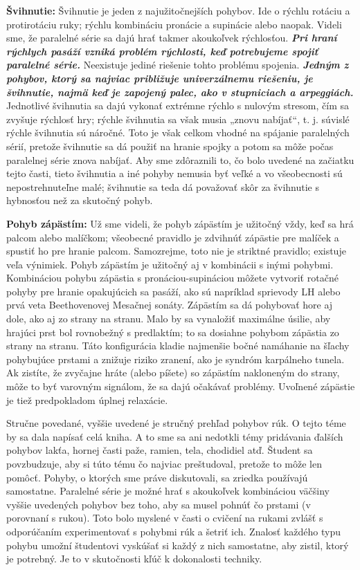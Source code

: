 \documentclass[11pt,a4paper%
]{book}
\begin{document}
\textbf{Švihnutie:} Švihnutie je jeden z najužitočnejších pohybov. Ide o rýchlu rotáciu a protirotáciu ruky; rýchlu kombináciu pronácie a supinácie alebo naopak. Videli sme, že paralelné série sa dajú hrať takmer akoukoľvek rýchlosťou. \emph{\textbf{Pri hraní rýchlych pasáží vzniká problém rýchlosti, keď potrebujeme spojiť paralelné série.}} Neexistuje jediné riešenie tohto problému spojenia. \emph{\textbf{Jedným z pohybov, ktorý sa najviac približuje univerzálnemu riešeniu, je švihnutie, najmä keď je zapojený palec, ako v stupniciach a arpeggiách.}} Jednotlivé švihnutia sa dajú vykonať extrémne rýchlo s nulovým stresom, čím sa zvyšuje rýchlosť hry; rýchle švihnutia sa však musia „znovu nabíjať``, t. j. súvislé rýchle švihnutia sú náročné. Toto je však celkom vhodné na spájanie paralelných sérií, pretože švihnutie sa dá použiť na hranie spojky a potom sa môže počas paralelnej série znova nabíjať. Aby sme zdôraznili to, čo bolo uvedené na začiatku tejto časti, tieto švihnutia a iné pohyby nemusia byť veľké a vo všeobecnosti sú nepostrehnuteľne malé; švihnutie sa teda dá považovať skôr za švihnutie s hybnosťou než za skutočný pohyb.

\textbf{Pohyb zápästím:} Už sme videli, že pohyb zápästím je užitočný vždy, keď sa hrá palcom alebo malíčkom; všeobecné pravidlo je zdvihnúť zápästie pre malíček a spustiť ho pre hranie palcom. Samozrejme, toto nie je striktné pravidlo; existuje veľa výnimiek. Pohyb zápästím je užitočný aj v kombinácii s inými pohybmi. Kombináciou pohybu zápästia s pronáciou-supináciou môžete vytvoriť rotačné pohyby pre hranie opakujúcich sa pasáží, ako sú napríklad sprievody LH alebo prvá veta Beethovenovej Mesačnej sonáty. Zápästím sa dá pohybovať hore aj dole, ako aj zo strany na stranu. Malo by sa vynaložiť maximálne úsilie, aby hrajúci prst bol rovnobežný s predlaktím; to sa dosiahne pohybom zápästia zo strany na stranu. Táto konfigurácia kladie najmenšie bočné namáhanie na šľachy pohybujúce prstami a znižuje riziko zranení, ako je syndróm karpálneho tunela. Ak zistíte, že zvyčajne hráte (alebo píšete) so zápästím nakloneným do strany, môže to byť varovným signálom, že sa dajú očakávať problémy. Uvoľnené zápästie je tiež predpokladom úplnej relaxácie.

Stručne povedané, vyššie uvedené je stručný prehľad pohybov rúk. O tejto téme by sa dala napísať celá kniha. A to sme sa ani nedotkli témy pridávania ďalších pohybov lakťa, hornej časti paže, ramien, tela, chodidiel atď. Študent sa povzbudzuje, aby si túto tému čo najviac preštudoval, pretože to môže len pomôcť. Pohyby, o ktorých sme práve diskutovali, sa zriedka používajú samostatne. Paralelné série je možné hrať s akoukoľvek kombináciou väčšiny vyššie uvedených pohybov bez toho, aby sa musel pohnúť čo prstami (v porovnaní s rukou). Toto bolo myslené v časti o cvičení na rukami zvlášť s odporúčaním experimentovať s pohybmi rúk a šetriť ich. Znalosť každého typu pohybu umožní študentovi vyskúšať si každý z nich samostatne, aby zistil, ktorý je potrebný. Je to v skutočnosti kľúč k dokonalosti techniky.
\end{document}

